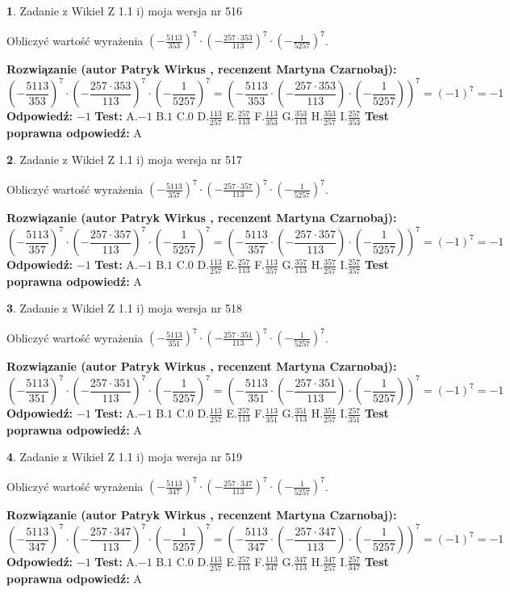 \documentclass[12pt, a4paper]{article}
\theoremstyle{definition} %
\newtheorem{zad}{}
\newcommand{\zadStart}[1]{\begin{zad}#1\newline}
\newcommand{\zadStop}{\end{zad}}
\newcommand{\rozwStart}[2]{\noindent \textbf{Rozwiązanie (autor #1 , recenzent #2): }\newline}
\newcommand{\rozwStop}{\newline}
\newcommand{\odpStart}{\noindent \textbf{Odpowiedź:}\newline}
\newcommand{\odpStop}{\newline}
\newcommand{\testStart}{\noindent \textbf{Test:}\newline}
\newcommand{\testStop}{\newline}
\newcommand{\kluczStart}{\noindent \textbf{Test poprawna odpowiedź:}\newline}
\newcommand{\kluczStop}{\newline}
\begin{document}
\zadStart{Zadanie z Wikieł Z 1.1 i) moja wersja nr 516}

Obliczyć wartość wyrażenia $(-\frac{5113}{353})^{7} \cdot (-\frac{257 \cdot 353}{113})^{7} \cdot (-\frac{1}{5257})^{7}$.
\zadStop
\rozwStart{Patryk Wirkus}{Martyna Czarnobaj}
$$(-\frac{5113}{353})^{7} \cdot (-\frac{257 \cdot 353}{113})^{7} \cdot (-\frac{1}{5257})^{7} = (-\frac{5113}{353} \cdot (-\frac{257 \cdot 353}{113}) \cdot (-\frac{1}{5257}))^{7} = (-1)^{7} = -1$$
\rozwStop
\odpStart
$-1$
\odpStop
\testStart
A.$-1$ B.$1$ C.$0$ D.$\frac{113}{257}$ E.$\frac{257}{113}$
F.$\frac{113}{353}$ G.$\frac{353}{113}$
H.$\frac{353}{257}$
I.$\frac{257}{353}$
\testStop
\kluczStart
A
\kluczStop



\zadStart{Zadanie z Wikieł Z 1.1 i) moja wersja nr 517}

Obliczyć wartość wyrażenia $(-\frac{5113}{357})^{7} \cdot (-\frac{257 \cdot 357}{113})^{7} \cdot (-\frac{1}{5257})^{7}$.
\zadStop
\rozwStart{Patryk Wirkus}{Martyna Czarnobaj}
$$(-\frac{5113}{357})^{7} \cdot (-\frac{257 \cdot 357}{113})^{7} \cdot (-\frac{1}{5257})^{7} = (-\frac{5113}{357} \cdot (-\frac{257 \cdot 357}{113}) \cdot (-\frac{1}{5257}))^{7} = (-1)^{7} = -1$$
\rozwStop
\odpStart
$-1$
\odpStop
\testStart
A.$-1$ B.$1$ C.$0$ D.$\frac{113}{257}$ E.$\frac{257}{113}$
F.$\frac{113}{357}$ G.$\frac{357}{113}$
H.$\frac{357}{257}$
I.$\frac{257}{357}$
\testStop
\kluczStart
A
\kluczStop



\zadStart{Zadanie z Wikieł Z 1.1 i) moja wersja nr 518}

Obliczyć wartość wyrażenia $(-\frac{5113}{351})^{7} \cdot (-\frac{257 \cdot 351}{113})^{7} \cdot (-\frac{1}{5257})^{7}$.
\zadStop
\rozwStart{Patryk Wirkus}{Martyna Czarnobaj}
$$(-\frac{5113}{351})^{7} \cdot (-\frac{257 \cdot 351}{113})^{7} \cdot (-\frac{1}{5257})^{7} = (-\frac{5113}{351} \cdot (-\frac{257 \cdot 351}{113}) \cdot (-\frac{1}{5257}))^{7} = (-1)^{7} = -1$$
\rozwStop
\odpStart
$-1$
\odpStop
\testStart
A.$-1$ B.$1$ C.$0$ D.$\frac{113}{257}$ E.$\frac{257}{113}$
F.$\frac{113}{351}$ G.$\frac{351}{113}$
H.$\frac{351}{257}$
I.$\frac{257}{351}$
\testStop
\kluczStart
A
\kluczStop



\zadStart{Zadanie z Wikieł Z 1.1 i) moja wersja nr 519}

Obliczyć wartość wyrażenia $(-\frac{5113}{347})^{7} \cdot (-\frac{257 \cdot 347}{113})^{7} \cdot (-\frac{1}{5257})^{7}$.
\zadStop
\rozwStart{Patryk Wirkus}{Martyna Czarnobaj}
$$(-\frac{5113}{347})^{7} \cdot (-\frac{257 \cdot 347}{113})^{7} \cdot (-\frac{1}{5257})^{7} = (-\frac{5113}{347} \cdot (-\frac{257 \cdot 347}{113}) \cdot (-\frac{1}{5257}))^{7} = (-1)^{7} = -1$$
\rozwStop
\odpStart
$-1$
\odpStop
\testStart
A.$-1$ B.$1$ C.$0$ D.$\frac{113}{257}$ E.$\frac{257}{113}$
F.$\frac{113}{347}$ G.$\frac{347}{113}$
H.$\frac{347}{257}$
I.$\frac{257}{347}$
\testStop
\kluczStart
A
\kluczStop
\end{document}
